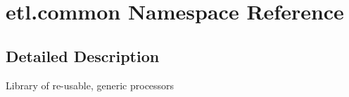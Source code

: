\hypertarget{namespaceetl_1_1common}{\section{etl.\-common Namespace Reference}
\label{namespaceetl_1_1common}
}


\subsection{Detailed Description}
\begin{DoxyVerb}Library of re-usable, generic processors\end{DoxyVerb}
 